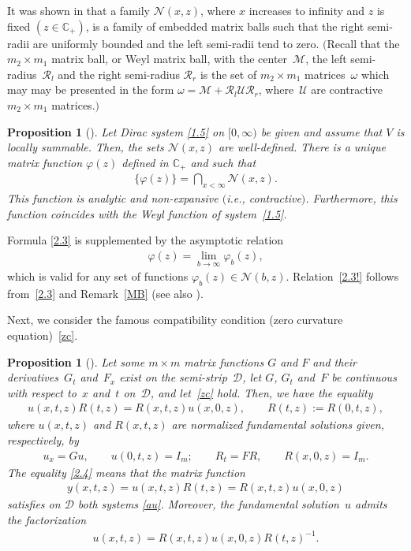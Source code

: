 \documentclass[11pt]{article}
\newtheorem{Proposition}[Theorem]{Proposition}
{\theoremstyle{definition}
\newtheorem{Definition}[Theorem]{Definition}
\newtheorem{Notation}[Theorem]{Notation}
\newtheorem{Example}[Theorem]{Example}
\newtheorem{Remark}[Theorem]{Remark}
}
\def\om{\omega}
\def\vp{\varphi}
\def\BC{{\mathbb C}}
\def\clr{{\mathcal R}}
\def\clm{{\mathcal M}}
\def\cln{{\mathcal N}}
\def\clu{{\mathcal U}}
\newcommand{\cD}{{\mathcal D}}
\numberwithin{equation}{section}
\begin{document}
 \begin{Remark}\label{MB}
 It was shown in \cite{FKRSp1} that a family $\cln(x,z)$, where $x$ increases to inf\/inity and $z$ is f\/ixed
 $(z \in \BC_+)$,
is a family of embedded matrix balls such that the right semi-radii
 are uniformly bounded and the left semi-radii tend to zero. $($Recall that the $m_2\times m_1$ matrix ball, or Weyl matrix ball, with the center~$\clm$, the left semi-radius~$\clr_l$
 and the right semi-radius $\clr_r$ is the set of
 $m_2\times m_1$ matrices~$\om$
 which may may be presented
 in the form $\om = \clm + \clr_l \clu \clr_r$, where~$\clu$ are contractive $m_2\times m_1$ matrices.$)$
 \end{Remark}

 \begin{Proposition}[\cite{FKRSp1}] \label{PnW1} Let Dirac system \eqref{1.5} on $[0, \infty)$
 be given and assume that $V$ is locally summable.
 Then, the sets $\cln(x,z)$
 are well-defined. There is a unique matrix function
 $\vp(z)$ defined in $\BC_+$ and such that
\begin{gather}  \label{2.3}
\{\vp(z) \}=\bigcap_{x<\infty}\cln(x,z).
\end{gather}
This function is analytic and non-expansive $($i.e., contractive$)$.
Furthermore, this function coincides with the Weyl function of system~\eqref{1.5}.
 \end{Proposition}

Formula \eqref{2.3} is supplemented by the asymptotic relation
\begin{gather}  \label{2.3!}
\vp(z)=\lim_{b \to \infty}\vp_b(z),
\end{gather}
which is valid for any set of functions $\vp_b(z)\in \cln(b,z)$. Relation~\eqref{2.3!} follows from~\eqref{2.3}
and Remark~\ref{MB} (see also \cite[Remark~2.24]{SaSaR}).

Next, we consider the famous compatibility condition (zero curvature equation)~\eqref{zc}.
\begin{Proposition}[\cite{SaAF}] \label{TmM}
Let some $m \times m$ matrix functions $G$ and $F$ and their derivatives~$G_t$ and~$F_x$ exist on the semi-strip~$\cD$,
let $G$, $G_t$ and~$F$ be continuous with respect to~$x$ and~$t$ on~$\mathcal{D}$,
 and let~\eqref{zc}
hold. Then, we have the equality
\begin{gather} \label{2.4}
u(x,t,z)R(t,z)=R(x,t,z)u(x,0,z), \qquad R(t,z):=R(0,t,z),
\end{gather}
where $u(x,t,z)$ and $R(x,t,z)$ are normalized fundamental solutions given, respectively, by
\begin{gather} \label{2.5}
u_x=Gu, \qquad u(0,t,z)=I_m; \qquad R_t=FR, \qquad R(x,0,z)=I_m.
\end{gather}
The equality \eqref{2.4} means that the matrix function
\begin{gather*}
y(x,t,z)=u(x,t,z)R(t,z)=R(x,t,z)u(x,0,z)
\end{gather*}
satisf\/ies on $\cD$ both systems \eqref{au}. Moreover, the fundamental solution~$u$ admits the factorization
\begin{gather} \label{2.6}
u(x,t,z)=R(x,t,z)u(x,0,z)R(t,z)^{-1}.
\end{gather}
\end{Proposition}
\end{document}

